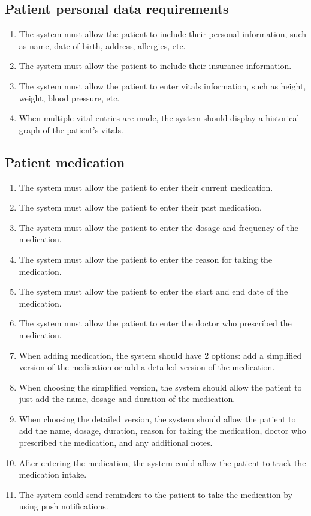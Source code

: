 \subsection{Patient personal data requirements}
\begin{enumerate}
    \item The system must allow the patient to include their personal information, such as name, date of birth, address, allergies, etc.
    \item The system must allow the patient to include their insurance information.
    \item The system must allow the patient to enter vitals information, such as height, weight, blood pressure, etc.
    \item When multiple vital entries are made, the system should display a historical graph of the patient's vitals.
\end{enumerate}

\subsection{Patient medication}
\begin{enumerate}
    \item The system must allow the patient to enter their current medication.
    \item The system must allow the patient to enter their past medication.
    \item The system must allow the patient to enter the dosage and frequency of the medication.
    \item The system must allow the patient to enter the reason for taking the medication.
    \item The system must allow the patient to enter the start and end date of the medication.
    \item The system must allow the patient to enter the doctor who prescribed the medication.
    \item When adding medication, the system should have 2 options: add a simplified version of the medication or add a detailed version of the medication.
    \item When choosing the simplified version, the system should allow the patient to just add the name, dosage and duration of the medication.
    \item When choosing the detailed version, the system should allow the patient to add the name, dosage, duration, reason for taking the medication, doctor who prescribed the medication, and any additional notes.
    \item After entering the medication, the system could allow the patient to track the medication intake.
    \item The system could send reminders to the patient to take the medication by using push notifications.
\end{enumerate}

